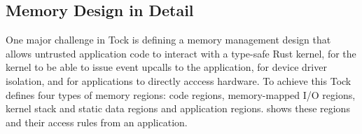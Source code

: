 %

\subsection{\name Memory Design in Detail}
\label{sec:arch:memory-design}

One major challenge in Tock is defining a memory management design
that allows untrusted application code 
to interact with a type-safe Rust kernel, for the kernel to be able to
issue event upcalls to the application, for device driver isolation, and 
for applications to directly
acccess hardware. To achieve this
Tock defines four types of memory regions: code regions, 
memory-mapped I/O regions,
kernel stack and static data regions and application regions.
 shows these regions and their access rules from
an application.

